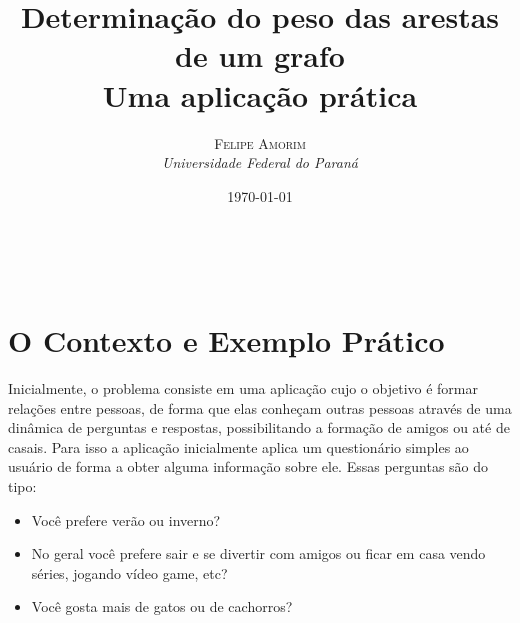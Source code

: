 \documentclass[a4paper, 11pt]{article} %
\title{Determinação do peso das arestas de um grafo\\Uma aplicação prática}\\ %
\author{\textsc{Felipe Amorim} %
\\{\textit{Universidade Federal do Paraná}}} %
\date{\today} %
\makeatletter
\renewcommand{\maketitle}{ %
\begin{flushright} %
{\LARGE\@title} %

\vspace{50pt} %

{\large\@author} %
\\\@date %

\vspace{40pt} %
\end{flushright}
}
\makeatother
\begin{document}
\maketitle %







\section*{O Contexto e Exemplo Prático}

Inicialmente, o problema consiste em uma aplicação cujo o objetivo é formar relações entre pessoas, de forma que elas conheçam outras pessoas através de uma dinâmica de perguntas e respostas, possibilitando a formação de amigos ou até de casais. Para isso a aplicação inicialmente aplica um questionário simples ao usuário de forma a obter alguma informação sobre ele. Essas perguntas são do tipo:

\begin{itemize}
  \item Você prefere verão ou inverno?
  \item No geral você prefere sair e se divertir com amigos ou ficar em casa vendo séries, jogando vídeo game, etc?
  \item Você gosta mais de gatos ou de cachorros?
\end{itemize}
\end{document}
